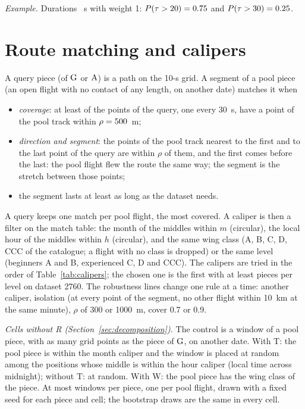 \emph{Example.} Durations \ToySurvDurations~s with weight 1: $P(\tau>20)=0.75$ and $P(\tau>30)=0.25$.

\section{Route matching and calipers}\label{app:route}

A query piece (of $\mathrm{G}$ or $\mathrm{A}$) is a path on the 10-s grid. A segment of a pool piece (an open flight with no contact of any length, on another date) matches it when
\begin{itemize}
  \item \emph{coverage}: at least \MatCover{} of the points of the query, one every 30~s, have a point of the pool track within $\rho=500$~m;
  \item \emph{direction and segment}: the points of the pool track nearest to the first and to the last point of the query are within $\rho$ of them, and the first comes before the last: the pool flight flew the route the same way; the segment is the stretch between those points;
  \item the segment lasts at least as long as the dataset needs.
\end{itemize}
A query keeps one match per pool flight, the most covered. A caliper is then a filter on the match table: the month of the middles within $m$ (circular), the local hour of the middles within $h$ (circular), and the same wing class (A, B, C, D, CCC of the catalogue; a flight with no class is dropped)
or the same level (beginners A and B, experienced C, D and CCC). The calipers are tried in the order of Table~\ref{tab:calipers}; the chosen one is the first with at least \MatMin{} pieces per level on dataset 2760. The robustness lines change one rule at a time: another caliper, isolation (at every point of the segment, no other flight within 10~km at the same minute),
$\rho$ of 300 or 1000~m, cover 0.7 or 0.9.

\emph{Cells without R (Section~\ref{sec:decomposition}).} The control is a window of a pool piece, with as many grid points as the piece of $\mathrm{G}$, on another date. With T: the pool piece is within the month caliper and the window is placed at random among the positions whose middle is within the hour caliper (local time across midnight); without T: at random.
With W: the pool piece has the wing class of the piece. At most \DecK{} windows per piece, one per pool flight, drawn with a fixed seed for each piece and cell; the bootstrap draws are the same in every cell.

